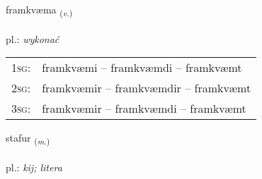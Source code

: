 \documentclass[frontgrid, backgrid]{flacards}\usepackage[]{graphicx}\usepackage[]{xcolor}
\begin{document}
\renewcommand{\flhead}{\vskip5pt \fboxsep=0pt {\small\bfseries\footnotesize Sagnorð | Verb}}
\renewcommand{\fcfoot}{\vskip5pt \fboxsep=0pt \hspace{2pt}{\small\bfseries\footnotesize 2K}}

\renewcommand{\blhead}{\vskip5pt {\small\bfseries\footnotesize Sagnorð | Verb }}
\renewcommand{\bcfoot}{\vskip5pt \hspace{2pt}{\small\bfseries\footnotesize 2K}}


{framkvæma \small{\textsubscript{(\textit{v.})}} \\[1ex] %
\textphonetic{[framkʰvaima]} \\
pl.: \emph{wykonać} \\  [2ex]
\renewcommand*{\arraystretch}{0.8}
\begin{tabular}{p{1cm}l}
\textsc{1sg}: & framkvæmi -- framkvæmdi -- framkvæmt \\ 
\textsc{2sg}: & framkvæmir -- framkvæmdir -- framkvæmt \\ 
\textsc{3sg}: & framkvæmir -- framkvæmdi -- framkvæmt \\ 
\end{tabular}
}

\renewcommand{\flhead}{\vskip5pt \fboxsep=0pt {\small\bfseries\footnotesize Nafnorð | Noun}}
\renewcommand{\fcfoot}{\vskip5pt \fboxsep=0pt \hspace{2pt}{\small\bfseries\footnotesize 2K}}

\renewcommand{\blhead}{\vskip5pt {\small\bfseries\footnotesize Nafnorð | Noun }}
\renewcommand{\bcfoot}{\vskip5pt \hspace{2pt}{\small\bfseries\footnotesize 2K}}


{stafur \small{\textsubscript{(\textit{m.})}} \\[1ex] %
\textphonetic{[staːvʏr]} \\
pl.: \emph{kij; litera} \\  [2ex]
\renewcommand*{\arraystretch}{0.8}
}
\end{document}
